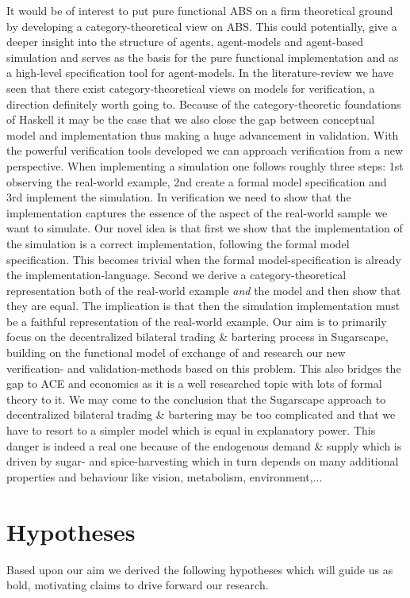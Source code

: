 It would be of interest to put pure functional ABS on a firm theoretical ground by developing a category-theoretical view on ABS. This could potentially, give a deeper insight into the structure of agents, agent-models and agent-based simulation and serves as the basis for the pure functional implementation and as a high-level specification tool for agent-models. In the literature-review we have seen that there exist category-theoretical views on models for verification, a direction definitely worth going to. Because of the category-theoretic foundations of Haskell it may be the case that we also close the gap between conceptual model and implementation thus making a huge advancement in validation.
With the powerful verification tools developed we can approach verification from a new perspective. When implementing a simulation one follows roughly three steps: 1st observing the real-world example, 2nd create a formal model specification and 3rd implement the simulation. In verification we need to show that the implementation captures the essence of the aspect of the real-world sample we want to simulate. Our novel idea is that first we show that the implementation of the simulation is a correct implementation, following the formal model specification. This becomes trivial when the formal model-specification is already the implementation-language. Second we derive a category-theoretical representation both of the real-world example \textit{and} the model and then show that they are equal. The implication is that then the simulation implementation must be a faithful representation of the real-world example.
Our aim is to primarily focus on the decentralized bilateral trading \& bartering process in Sugarscape, building on the functional model of exchange of \cite{botta_functional_2011} and research our new verification- and validation-methods based on this problem. This also bridges the gap to ACE and economics as it is a well researched topic with lots of formal theory to it. We may come to the conclusion that the Sugarscape approach to decentralized bilateral trading \& bartering may be too complicated and that we have to resort to a simpler model which is equal in explanatory power. This danger is indeed a real one because of the endogenous demand \& supply which is driven by sugar- and spice-harvesting which in turn depends on many additional properties and behaviour like vision, metabolism, environment,...

\section{Hypotheses}
Based upon our aim we derived the following hypotheses which will guide us as bold, motivating claims to drive forward our research.

